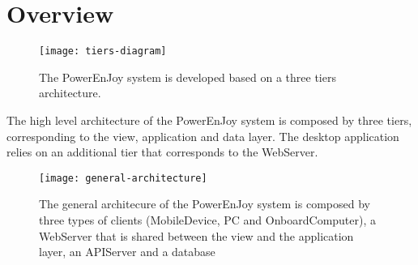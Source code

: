 \section{Overview}

\begin{figure}[H]
	\centering
	\texttt{[image: tiers-diagram]}
	\caption[Tiers Diagram]{The PowerEnJoy system is developed based on a three tiers architecture.}
	\label{fig:tiers-diagram}
\end{figure}

The high level architecture of the PowerEnJoy system is composed by three tiers, corresponding to the view, application and data layer. The desktop application relies on an additional tier that corresponds to the WebServer.

\begin{figure}[H]
	\centering
	\texttt{[image: general-architecture]}
	\caption[General Architecture]{The general architecure of the PowerEnJoy system is composed by three types of clients (MobileDevice, PC and OnboardComputer), a WebServer that is shared between the view and the application layer, an APIServer and a database}
	\label{fig:general-architecture}
\end{figure}
